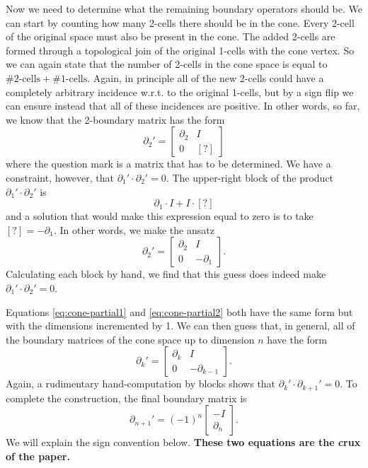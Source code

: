 \documentclass[twocolumn]{article}
\begin{document}
Now we need to determine what the remaining boundary operators should be.
We can start by counting how many 2-cells there should be in the cone.
Every 2-cell of the original space must also be present in the cone.
The added 2-cells are formed through a topological join of the original 1-cells with the cone vertex.
So we can again state that the number of 2-cells in the cone space is equal to $\#\text{2-cells} + \#\text{1-cells}$.
Again, in principle all of the new 2-cells could have a completely arbitrary incidence w.r.t. to the original 1-cells, but by a sign flip we can ensure instead that all of these incidences are positive.
In other words, so far, we know that the 2-boundary matrix has the form
\begin{equation}
    \partial_2' = \left[\begin{matrix}\partial_2 & I \\ 0 & [?]\end{matrix}\right]
\end{equation}
where the question mark is a matrix that has to be determined.
We have a constraint, however, that $\partial_1'\cdot\partial_2' = 0$.
The upper-right block of the product $\partial_1'\cdot\partial_2'$ is
\begin{equation}
    \partial_1\cdot I + I\cdot [?]
\end{equation}
and a solution that would make this expression equal to zero is to take $[?] = -\partial_1$.
In other words, we make the ansatz
\begin{equation}
    \partial_2' = \left[\begin{matrix}\partial_2 & I \\ 0 & -\partial_1\end{matrix}\right].
    \label{eq:cone-partial2}
\end{equation}
Calculating each block by hand, we find that this guess does indeed make $\partial_1'\cdot\partial_2' = 0$.

Equations \eqref{eq:cone-partial1} and \eqref{eq:cone-partial2} both have the same form but with the dimensions incremented by 1.
We can then guess that, in general, all of the boundary matrices of the cone space up to dimension $n$ have the form
\begin{equation}
    \partial_k' = \left[\begin{matrix}\partial_k & I \\ 0 & -\partial_{k - 1}\end{matrix}\right].
    \label{eq:cone-partial-k}
\end{equation}
Again, a rudimentary hand-computation by blocks shows that $\partial_k'\cdot\partial_{k + 1}' = 0$.
To complete the construction, the final boundary matrix is
\begin{equation}
    \partial_{n + 1}' = (-1)^n\left[\begin{matrix}-I \\ \partial_n\end{matrix}\right].
    \label{eq:cone-partial-n+1}
\end{equation}
We will explain the sign convention below.
\textbf{These two equations are the crux of the paper.}
\end{document}
